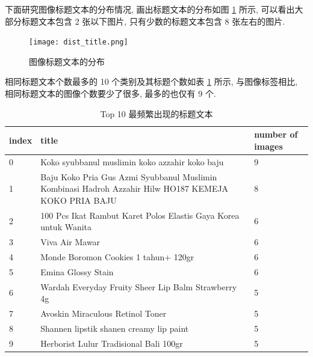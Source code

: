 \documentclass[12pt]{article}
\begin{document}
下面研究图像标题文本的分布情况, 画出标题文本的分布如图 \ref{fig:dist_title} 所示, 可以看出大部分标题文本包含 2 张以下图片, 只有少数的标题文本包含 8 张左右的图片.

\begin{figure}[htbp]
  \centering
  \texttt{[image: dist\_title.png]}
  \caption{图像标题文本的分布}
  \label{fig:dist_title}
\end{figure}

相同标题文本个数最多的 10 个类别及其标题个数如表 \ref{tab:most_frequent_title} 所示, 与图像标签相比, 相同标题文本的图像个数要少了很多, 最多的也仅有 9 个.

\begin{table}[htbp]
  \centering
  \footnotesize
  \caption{Top 10 最频繁出现的标题文本}
  \label{tab:most_frequent_title}
  \begin{tabular}{p{0.8cm}p{9cm}p{3cm}}
    \toprule
    index & title                                                                                                & number of images \\
    \midrule
    0     & Koko syubbanul muslimin koko azzahir koko baju                                                       & 9                \\
    1     & Baju Koko Pria Gus Azmi Syubbanul Muslimin Kombinasi Hadroh Azzahir Hilw HO187 KEMEJA KOKO PRIA BAJU & 8                \\
    2     & 100 Pcs Ikat Rambut Karet Polos Elastis Gaya Korea untuk Wanita                                      & 6                \\
    3     & Viva Air Mawar                                                                                       & 6                \\
    4     & Monde Boromon Cookies 1 tahun+ 120gr                                                                 & 6                \\
    5     & Emina Glossy Stain                                                                                   & 6                \\
    6     & Wardah Everyday Fruity Sheer Lip Balm Strawberry 4g                                                  & 5                \\
    7     & Avoskin Miraculous Retinol Toner                                                                     & 5                \\
    8     & Shannen lipstik shanen creamy lip paint                                                              & 5                \\
    9     & Herborist Lulur Tradisional Bali 100gr                                                               & 5               \\
    \bottomrule
  \end{tabular}
\end{table}
\end{document}
